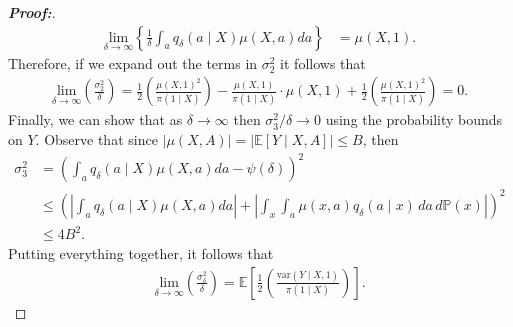 \documentclass[10pt,a4paper]{amsart}
\newcommand{\var}{\text{var}}
\begin{document}
\begin{proof}[\textbf{Proof:}]
\begin{align*}
     \underset{\delta \to \infty}{\text{lim}}\left\{\frac{1}{\delta}\int_a q_\delta(a\mid X) \mu(X, a) da \right\} &= \mu(X, 1).
\end{align*}
Therefore, if we expand out the terms in $\sigma^2_2$ it follows that
\begin{align*}
    \underset{\delta \to \infty}{\text{lim}}\left( \frac{\sigma_2^2}{\delta}\right) = \frac{1}{2}\left(\frac{\mu(X,1)^2}{\pi(1\mid X)} \right) - \frac{\mu(X,1)}{\pi(1\mid X)}\cdot \mu(X,1)  + \frac{1}{2}\left( \frac{\mu(X,1)^2}{\pi(1\mid X)}\right) = 0.
\end{align*}
Finally, we can show that as $\delta \to \infty$ then $\sigma_3^2 / \delta \to 0$ using the probability bounds on $Y$. Observe that since $| \mu(X, A)| = |\mathbb{E}[Y \mid X, A]|  \leq B$, then
\begin{align*}
    \sigma^2_3 &=  \left(\int_a q_\delta(a \mid X) \mu(X, a)da  - \psi(\delta) \right)^2 \\
    &\leq \left(\left|\int_a q_\delta(a \mid X) \mu(X, a)da \right| + \left|\int_x \int_a \mu(x, a) q_\delta(a \mid x) \, da \, d\mathbb{P}(x) \right| \right)^2 \\
    &\leq 4B^2.
\end{align*}
Putting everything together, it follows that
\begin{align*}
     \underset{\delta \to \infty}{\text{lim}}\left( \frac{\sigma^2_\delta }{\delta}\right) = \mathbb{E} \left[\frac{1}{2} \left( \frac{\var(Y \mid X,1)}{\pi(1 \mid X)} \right) \right].
\end{align*}
\end{proof}
\end{document}
